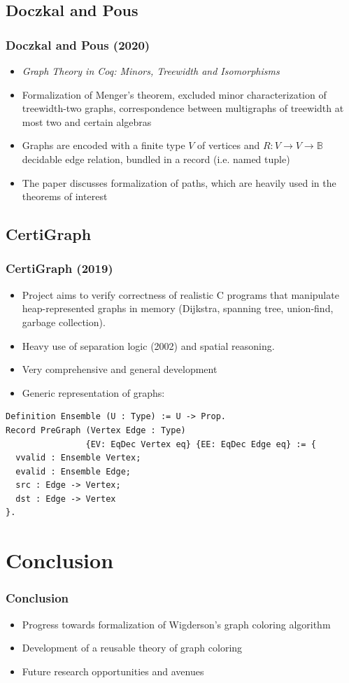 \documentclass{beamer}
\begin{document}
\subsection{Doczkal and Pous}
\begin{frame}
\frametitle{Doczkal and Pous (2020)}
\begin{itemize}
\item \textit{Graph Theory in Coq: Minors, Treewidth and Isomorphisms}
\item Formalization of Menger's theorem, excluded minor
  characterization of treewidth-two graphs, correspondence between
  multigraphs of treewidth at most two and certain algebras
\item Graphs are encoded with a finite type $V$ of vertices and $R :
  V\to V\to\mathbb{B}$ decidable edge relation, bundled in a record
  (i.e. named tuple)
\item The paper discusses formalization of paths, which are heavily
  used in the theorems of interest
\end{itemize}
\end{frame}

\subsection{CertiGraph}
\begin{frame}[fragile]
\frametitle{CertiGraph (2019)}
\begin{itemize}
\item Project aims to verify correctness of realistic C programs that
  manipulate heap-represented graphs in memory (Dijkstra, spanning
  tree, union-find, garbage collection).
\item Heavy use of separation logic (2002) and spatial reasoning.
\item Very comprehensive and general development
\item Generic representation of graphs:
\end{itemize}
\begin{verbatim}
Definition Ensemble (U : Type) := U -> Prop.
Record PreGraph (Vertex Edge : Type)
                {EV: EqDec Vertex eq} {EE: EqDec Edge eq} := {
  vvalid : Ensemble Vertex;
  evalid : Ensemble Edge;
  src : Edge -> Vertex;
  dst : Edge -> Vertex
}.
\end{verbatim}
\end{frame}

\section{Conclusion}
\begin{frame}
\frametitle{Conclusion}
\begin{itemize}
\item Progress towards formalization of Wigderson's graph coloring algorithm
\item Development of a reusable theory of graph coloring
\item Future research opportunities and avenues
\end{itemize}
\end{frame}
\end{document}
